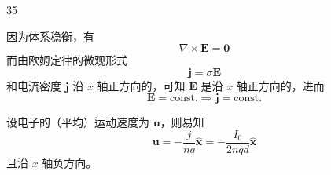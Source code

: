 \begin{solution}{35}
    \begin{subsolution}
        因为体系稳衡，有
        \begin{equation}
            \nabla \times \pmb {E} = \mathbf {0}
            \label{eq:1.s35}
        \end{equation}
        而由欧姆定律的微观形式
        \begin{equation}
            \boldsymbol {j} = \sigma \boldsymbol {E}
            \label{eq:2.s35}
        \end{equation}
        和电流密度 $\pmb{j}$ 沿 $x$ 轴正方向的，可知 $\pmb{E}$ 是沿 $x$ 轴正方向的，进而
        \begin{equation}
            \pmb {E} = \mathrm{const.} \Rightarrow \pmb {j} = \mathrm{const.}
            \label{eq:3.s35}
        \end{equation}
    \end{subsolution}
    \begin{subsolution}
        设电子的（平均）运动速度为 $\pmb{u}$，则易知
        \begin{equation}
            \pmb {u} = - \frac {j}{n q} \hat {\pmb {x}} = - \frac {I _ {0}}{2 n q d} \hat {\pmb {x}}
            \label{eq:4.s35}
        \end{equation}
        且沿 $x$ 轴负方向。


\end{subsolution}
\end{solution}
